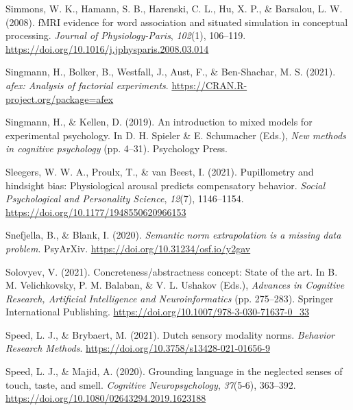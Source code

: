 \documentclass[
  12pt,
  man,floatsintext]{apa7}
\newlength{\cslhangindent}
\newlength{\cslentryspacingunit} %
\newenvironment{CSLReferences}[2] %
 {%
  \setlength{\parindent}{0pt}
  \ifodd #1
  \let\oldpar\par
  \def\par{\hangindent=\cslhangindent\oldpar}
  \fi
  \setlength{\parskip}{#2\cslentryspacingunit}
 }%
 {}
\begin{document}
\begin{CSLReferences}{1}{0}
\leavevmode{}%
Simmons, W. K., Hamann, S. B., Harenski, C. L., Hu, X. P., \& Barsalou, L. W. (2008). {fMRI} evidence for word association and situated simulation in conceptual processing. \emph{Journal of Physiology-Paris}, \emph{102}(1), 106--119. \url{https://doi.org/10.1016/j.jphysparis.2008.03.014}

\leavevmode{}%
Singmann, H., Bolker, B., Westfall, J., Aust, F., \& Ben-Shachar, M. S. (2021). \emph{{afex}: Analysis of factorial experiments}. \url{https://CRAN.R-project.org/package=afex}

\leavevmode{}%
Singmann, H., \& Kellen, D. (2019). An introduction to mixed models for experimental psychology. In D. H. Spieler \& E. Schumacher (Eds.), \emph{New methods in cognitive psychology} (pp. 4--31). {Psychology Press}.

\leavevmode{}%
Sleegers, W. W. A., Proulx, T., \& van Beest, I. (2021). Pupillometry and hindsight bias: Physiological arousal predicts compensatory behavior. \emph{Social Psychological and Personality Science}, \emph{12}(7), 1146--1154. \url{https://doi.org/10.1177/1948550620966153}

\leavevmode{}%
Snefjella, B., \& Blank, I. (2020). \emph{Semantic norm extrapolation is a missing data problem}. {PsyArXiv}. \url{https://doi.org/10.31234/osf.io/y2gav}

\leavevmode{}%
Solovyev, V. (2021). Concreteness/abstractness concept: State of the art. In B. M. Velichkovsky, P. M. Balaban, \& V. L. Ushakov (Eds.), \emph{Advances in {Cognitive Research}, {Artificial Intelligence} and {Neuroinformatics}} (pp. 275--283). {Springer International Publishing}. \url{https://doi.org/10.1007/978-3-030-71637-0_33}

\leavevmode{}%
Speed, L. J., \& Brybaert, M. (2021). Dutch sensory modality norms. \emph{Behavior Research Methods}. \url{https://doi.org/10.3758/s13428-021-01656-9}

\leavevmode{}%
Speed, L. J., \& Majid, A. (2020). Grounding language in the neglected senses of touch, taste, and smell. \emph{Cognitive Neuropsychology}, \emph{37}(5-6), 363--392. \url{https://doi.org/10.1080/02643294.2019.1623188}


\end{CSLReferences}
\end{document}
